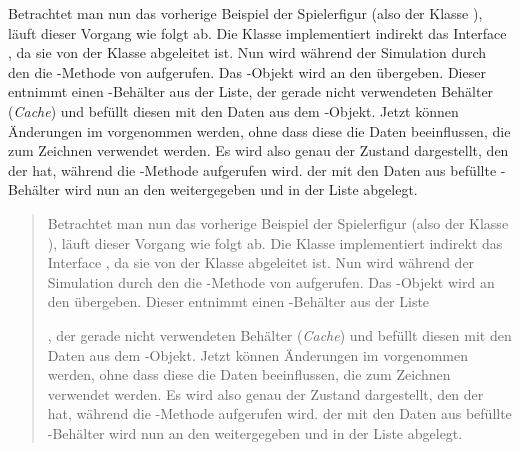 \documentclass[12pt,a4paper,listof=totocnumbered,parskip=half, abstract=yes]{scrartcl}
\begin{document}
Betrachtet man nun das vorherige Beispiel der Spielerfigur (also der Klasse ), läuft dieser Vorgang wie folgt ab. Die Klasse  implementiert indirekt das Interface , da sie von der Klasse  abgeleitet ist. Nun wird während der Simulation durch den  die -Methode von  aufgerufen. Das -Objekt wird an den  übergeben. Dieser entnimmt einen -Behälter aus der Liste, der gerade nicht verwendeten Behälter (\emph{Cache}) und befüllt diesen mit den Daten aus dem -Objekt. Jetzt können Änderungen im  vorgenommen werden, ohne dass diese die Daten beeinflussen, die zum Zeichnen verwendet werden. Es wird also genau der Zustand dargestellt, den der  hat, während die -Methode aufgerufen wird. der mit den Daten aus  befüllte -Behälter wird nun an den  weitergegeben und in der Liste  abgelegt.

\begin{quotation}
	Betrachtet man nun das vorherige Beispiel der Spielerfigur (also der Klasse ), läuft dieser Vorgang wie folgt ab. Die Klasse  implementiert indirekt das Interface , da sie von der Klasse  abgeleitet ist. Nun wird während der Simulation durch den  die -Methode von  aufgerufen. Das -Objekt wird an den  übergeben. Dieser entnimmt einen -Behälter aus der Liste
	
	, der gerade nicht verwendeten Behälter (\emph{Cache}) und befüllt diesen mit den Daten aus dem -Objekt. Jetzt können Änderungen im  vorgenommen werden, ohne dass diese die Daten beeinflussen, die zum Zeichnen verwendet werden. Es wird also genau der Zustand dargestellt, den der  hat, während die -Methode aufgerufen wird. der mit den Daten aus  befüllte -Behälter wird nun an den  weitergegeben und in der Liste  abgelegt.
\end{quotation}
\end{document}
